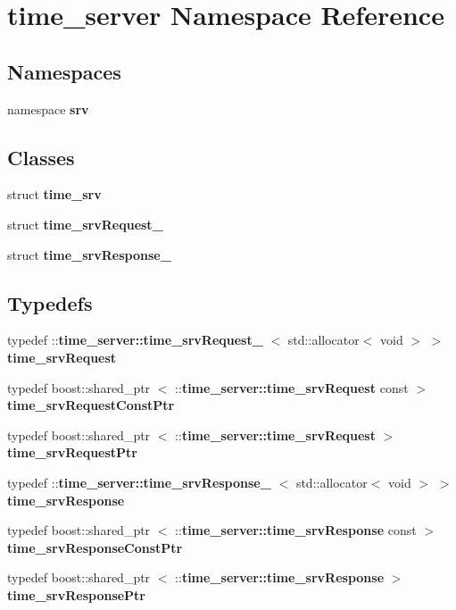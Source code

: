 \section{time\-\_\-server \-Namespace \-Reference}
\label{namespacetime__server}
\subsection*{\-Namespaces}
\begin{DoxyCompactItemize}
\item 
namespace {\bf srv}
\end{DoxyCompactItemize}
\subsection*{\-Classes}
\begin{DoxyCompactItemize}
\item 
struct {\bf time\-\_\-srv}
\item 
struct {\bf time\-\_\-srv\-Request\-\_\-}
\item 
struct {\bf time\-\_\-srv\-Response\-\_\-}
\end{DoxyCompactItemize}
\subsection*{\-Typedefs}
\begin{DoxyCompactItemize}
\item 
typedef \*
\-::{\bf time\-\_\-server\-::time\-\_\-srv\-Request\-\_\-}\*
$<$ std\-::allocator$<$ void $>$ $>$ {\bf time\-\_\-srv\-Request}
\item 
typedef boost\-::shared\-\_\-ptr\*
$<$ \-::{\bf time\-\_\-server\-::time\-\_\-srv\-Request} \*
const  $>$ {\bf time\-\_\-srv\-Request\-Const\-Ptr}
\item 
typedef boost\-::shared\-\_\-ptr\*
$<$ \-::{\bf time\-\_\-server\-::time\-\_\-srv\-Request} $>$ {\bf time\-\_\-srv\-Request\-Ptr}
\item 
typedef \*
\-::{\bf time\-\_\-server\-::time\-\_\-srv\-Response\-\_\-}\*
$<$ std\-::allocator$<$ void $>$ $>$ {\bf time\-\_\-srv\-Response}
\item 
typedef boost\-::shared\-\_\-ptr\*
$<$ \-::{\bf time\-\_\-server\-::time\-\_\-srv\-Response} \*
const  $>$ {\bf time\-\_\-srv\-Response\-Const\-Ptr}
\item 
typedef boost\-::shared\-\_\-ptr\*
$<$ \-::{\bf time\-\_\-server\-::time\-\_\-srv\-Response} $>$ {\bf time\-\_\-srv\-Response\-Ptr}
\end{DoxyCompactItemize}


